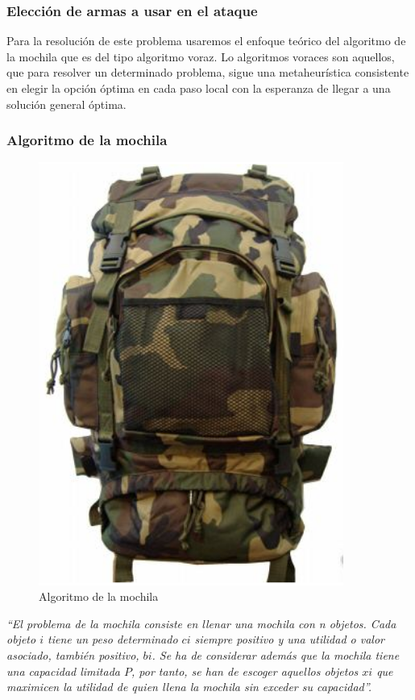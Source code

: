 \documentclass[a4paper,12pt,oneside]{book}
\begin{document}
\subsubsection*{Elección de armas a usar en el ataque}
Para la resolución de este problema usaremos el enfoque teórico del algoritmo de la mochila que es del tipo algoritmo voraz. Lo algoritmos voraces son aquellos, que para resolver un determinado problema, sigue una metaheurística consistente en elegir la opción óptima en cada paso local con la esperanza de llegar a una solución general óptima.
\subsubsection*{Algoritmo de la mochila}
\begin{figure}[!h]
  \centering
  \includegraphics[width=10cm]{images/mochila.png}
  \caption{Algoritmo de la mochila}
\end{figure}
\begin{center}
\textit{“El problema de la mochila consiste en llenar una mochila con n objetos. Cada objeto $i$ tiene un peso determinado $ci$ siempre positivo y una utilidad o valor asociado, también positivo, $bi$. Se ha de considerar además que la mochila tiene una capacidad limitada $P$, por tanto, se han de escoger aquellos objetos $xi$ que maximicen la utilidad de quien llena la mochila sin exceder su capacidad”.}
\end{center}
\end{document}

